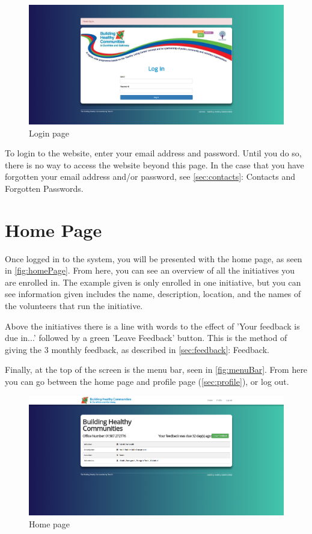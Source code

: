 \documentclass{bhcguides}
\begin{document}
\begin{figure}[h!]
 \centerline{\includegraphics[width=\textwidth, height=\textheight, keepaspectratio]{loginscreen.png}}
 \caption{Login page}
 \label{fig:initialLogin}
\end{figure}

To login to the website, enter your email address and password. Until you do so, there is no way to access the website beyond this page. In the case that you have forgotten your email address and/or password, see \autoref{sec:contacts}: Contacts and Forgotten Passwords.

\pagebreak

\section{Home Page}
\label{sec:homepage}

Once logged in to the system, you will be presented with the home page, as seen in \autoref{fig:homePage}. From here, you can see an overview of all the initiatives you are enrolled in. The example given is only enrolled in one initiative, but you can see information given includes the name, description, location, and the names of the volunteers that run the initiative.

Above the initiatives there is a line with words to the effect of 'Your feedback is due in...' followed by a green 'Leave Feedback' button. This is the method of giving the 3 monthly feedback, as described in \autoref{sec:feedback}: Feedback.

Finally, at the top of the screen is the menu bar, seen in \autoref{fig:menuBar}. From here you can go between the home page and profile page (\autoref{sec:profile}), or log out.

\begin{figure}[h]
 \centerline{\includegraphics[width=\textwidth, height=\textheight, keepaspectratio]{homepage.png}}
 \caption{Home page}
 \label{fig:homePage}
\end{figure}
\end{document}
